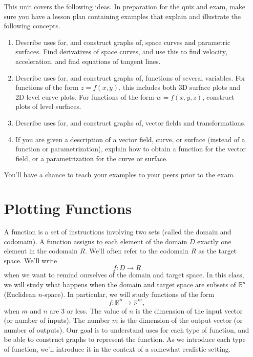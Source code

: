 
\noindent 
This unit covers the following ideas. In preparation for the quiz and exam, make sure you have a lesson plan containing examples that explain and illustrate the following concepts.  
\begin{enumerate}
\item Describe uses for, and construct graphs of, space curves and parametric surfaces. Find derivatives of space curves, and use this to find velocity, acceleration, and find equations of tangent lines.
\item Describe uses for, and construct graphs of, functions of several variables. For functions of the form $z=f(x,y)$, this includes both 3D surface plots and 2D level curve plots.  For functions of the form $w=f(x,y,z)$, construct plots of level surfaces.
\item Describe uses for, and construct graphs of, vector fields and transformations.
\item If you are given a description of a vector field, curve, or surface (instead of a function or parametrization), explain how to obtain a function for the vector field, or a parametrization for the curve or surface.
\end{enumerate}
You'll have a chance to teach your examples to your peers prior to the exam.


\section{Plotting Functions}
A function is a set of instructions involving two sets (called the domain and codomain).  A function assigns to each element of the domain $D$ exactly one element in the codomain $R$. We'll often refer to the codomain $R$ as the target space. 
We'll write {$$f:D\to R$$} when we want to remind ourselves of the domain and target space. 
In this class, we will study what happens when the domain and target space are subsets of {${\mathbb{R}}^n$} (Euclidean {$n$}-space). 
In particular, we will study functions of the form $$f:{\mathbb{R}}^n\to {\mathbb{R}}^m,$$ when $m$ and $n$ are 3 or less. The value of $n$ is the dimension of the input vector (or number of inputs).  The number $m$ is the dimension of the output vector (or number of outputs).
Our goal is to understand uses for each type of function, and be able to construct graphs to represent the function. 
As we introduce each type of function, we'll introduce it in the context of a somewhat realistic setting.  

